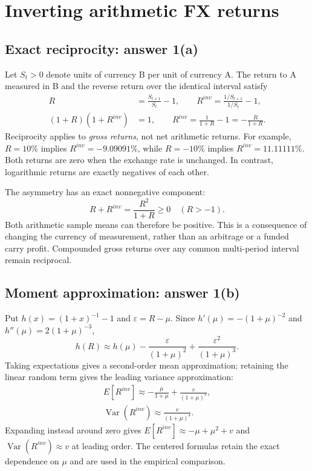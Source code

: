 \documentclass[11pt,letterpaper]{article}
\begin{document}
\section{Inverting arithmetic FX returns}
\subsection{Exact reciprocity: answer 1(a)}
Let $S_t>0$ denote units of currency B per unit of currency A. The return to A
measured in B and the reverse return over the identical interval satisfy
\begin{align}
R&=\frac{S_{t+1}}{S_t}-1,\qquad
R^{inv}=\frac{1/S_{t+1}}{1/S_t}-1,\\
(1+R)(1+R^{inv})&=1,\qquad
\boxed{R^{inv}=\frac{1}{1+R}-1=-\frac{R}{1+R}.}
\end{align}
Reciprocity applies to \emph{gross returns}, not net arithmetic returns.
For example, $R=10\%$ implies $R^{inv}=-9.09091\%$, while $R=-10\%$ implies
$R^{inv}=11.11111\%$. Both returns are zero when the exchange rate is unchanged.
In contrast, logarithmic returns are exactly negatives of each other.

The asymmetry has an exact nonnegative component:
\begin{equation}
R+R^{inv}=\frac{R^2}{1+R}\ge0\quad(R>-1).
\end{equation}
Both arithmetic sample means can therefore be positive. This is a consequence of
changing the currency of measurement, rather than an arbitrage or a funded carry profit.
Compounded gross returns over any common multi-period interval remain reciprocal.

\subsection{Moment approximation: answer 1(b)}
Put $h(x)=(1+x)^{-1}-1$ and $\varepsilon=R-\mu$. Since
$h'(\mu)=-(1+\mu)^{-2}$ and $h''(\mu)=2(1+\mu)^{-3}$,
\begin{equation}
h(R)\approx h(\mu)-\frac{\varepsilon}{(1+\mu)^2}
+\frac{\varepsilon^2}{(1+\mu)^3}.
\end{equation}
Taking expectations gives a second-order mean approximation; retaining the linear
random term gives the leading variance approximation:
\begin{align}
\boxed{E[R^{inv}]\approx-\frac{\mu}{1+\mu}+\frac{v}{(1+\mu)^3}},\\
\boxed{\operatorname{Var}(R^{inv})\approx\frac{v}{(1+\mu)^4}}.
\end{align}
Expanding instead around zero gives $E[R^{inv}]\approx-\mu+\mu^2+v$ and
$\operatorname{Var}(R^{inv})\approx v$ at leading order. The centered formulas
retain the exact dependence on $\mu$ and are used in the empirical comparison.
\end{document}
